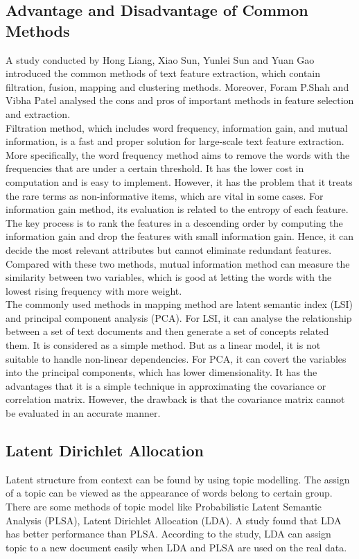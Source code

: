 \documentclass[12pt]{article}
\begin{document}
\subsection{Advantage and Disadvantage of Common Methods}
A study conducted by Hong Liang, Xiao Sun, Yunlei Sun and Yuan Gao \cite{liang2017text} introduced the common methods of text feature extraction, which contain filtration, fusion, mapping and clustering methods.  Moreover, Foram P.Shah and Vibha Patel analysed the cons and pros of important methods in feature selection and extraction\cite{shah2016review}. \\
 
Filtration method, which includes word frequency, information gain, and mutual information, is a fast and proper solution for large-scale text feature extraction. More specifically, the word frequency method aims to remove the words with the frequencies that are under a certain threshold. It has the lower cost in computation and is easy to implement. However, it has the problem that it treats the rare terms as non-informative items, which are vital in some cases. For information gain method, its evaluation is related to the entropy of each feature. The key process is to rank the features in a descending order by computing the information gain and drop the features with small information gain. Hence, it can decide the most relevant attributes but cannot eliminate redundant features. Compared with these two methods, mutual information method can measure the similarity between two variables, which is good at letting the words with the lowest rising frequency with more weight. \\
 
The commonly used methods in mapping method are latent semantic index (LSI) and principal component analysis (PCA). For LSI, it can analyse the relationship between a set of text documents and then generate a set of concepts related them. It is considered as a simple method. But as a linear model, it is not suitable to handle non-linear dependencies. For PCA, it can covert the variables into the principal components, which has lower dimensionality. It has the advantages that it is a simple technique in approximating the covariance or correlation matrix. However, the drawback is that the covariance matrix cannot be evaluated in an accurate manner. \\

\subsection{Latent Dirichlet Allocation}
Latent structure from context can be found by using topic modelling\cite{blei2003latent}. The assign of a topic can be viewed as the appearance of words belong to certain group. There are some methods of topic model like Probabilistic Latent Semantic Analysis (PLSA), Latent Dirichlet Allocation (LDA). A study found that LDA has better performance than PLSA\cite{barde2017overview}. According to the study, LDA can assign topic to a new document easily when LDA and PLSA are used on the real data.
\end{document}
